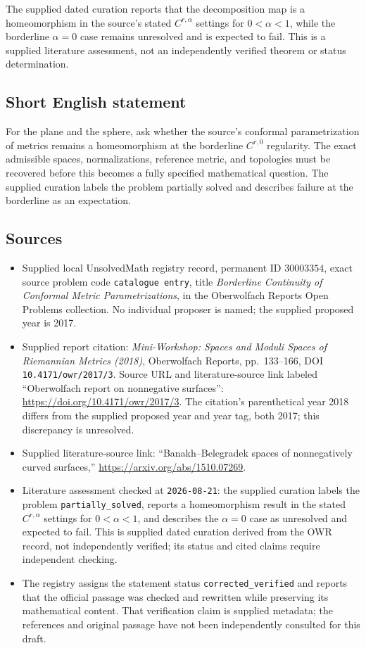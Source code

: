 \documentclass[11pt]{article}
\begin{document}
The supplied dated curation reports that the decomposition map is a homeomorphism in the source's stated \(C^{r,\alpha}\) settings for \(0<\alpha<1\), while the borderline \(\alpha=0\) case remains unresolved and is expected to fail. This is a supplied literature assessment, not an independently verified theorem or status determination.
\subsection{Short English statement}
For the plane and the sphere, ask whether the source's conformal parametrization of metrics remains a homeomorphism at the borderline \(C^{r,0}\) regularity. The exact admissible spaces, normalizations, reference metric, and topologies must be recovered before this becomes a fully specified mathematical question. The supplied curation labels the problem partially solved and describes failure at the borderline as an expectation.
\subsection{Sources}
\begin{itemize}
\item Supplied local UnsolvedMath registry record, permanent ID \(30003354\), exact source problem code \texttt{catalogue entry}, title \emph{Borderline Continuity of Conformal Metric Parametrizations}, in the Oberwolfach Reports Open Problems collection. No individual proposer is named; the supplied proposed year is 2017.
\item Supplied report citation: \emph{Mini-Workshop: Spaces and Moduli Spaces of Riemannian Metrics (2018)}, Oberwolfach Reports, pp.\ 133--166, DOI \texttt{10.4171/owr/2017/3}. Source URL and literature-source link labeled ``Oberwolfach report on nonnegative surfaces'': \url{https://doi.org/10.4171/owr/2017/3}. The citation's parenthetical year 2018 differs from the supplied proposed year and year tag, both 2017; this discrepancy is unresolved.
\item Supplied literature-source link: ``Banakh--Belegradek spaces of nonnegatively curved surfaces,'' \url{https://arxiv.org/abs/1510.07269}.
\item Literature assessment checked at \texttt{2026-08-21}: the supplied curation labels the problem \texttt{partially\_solved}, reports a homeomorphism result in the stated \(C^{r,\alpha}\) settings for \(0<\alpha<1\), and describes the \(\alpha=0\) case as unresolved and expected to fail. This is supplied dated curation derived from the OWR record, not independently verified; its status and cited claims require independent checking.
\item The registry assigns the statement status \texttt{corrected\_verified} and reports that the official passage was checked and rewritten while preserving its mathematical content. That verification claim is supplied metadata; the references and original passage have not been independently consulted for this draft.
\end{itemize}
\end{document}

